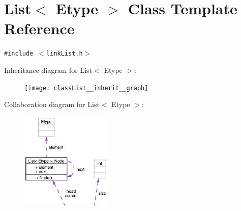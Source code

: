 \section{List$<$ Etype $>$ Class Template Reference}
\label{classList}
{\tt \#include $<$link\-List.h$>$}

Inheritance diagram for List$<$ Etype $>$:\begin{figure}[H]
\begin{center}
\leavevmode
\texttt{[image: classList\_\_inherit\_\_graph]}
\end{center}
\end{figure}
Collaboration diagram for List$<$ Etype $>$:\begin{figure}[H]
\begin{center}
\leavevmode
\includegraphics[width=122pt]{classList__coll__graph}
\end{center}
\end{figure}

